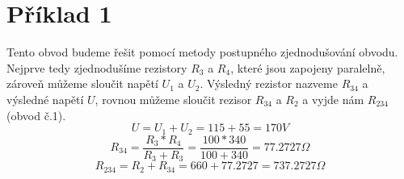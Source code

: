 \section{Příklad 1}
\maketitle
\noindent\makebox[\linewidth]{\rule{\textwidth}{0.3pt}}
Tento obvod budeme řešit pomocí metody postupného zjednodušování obvodu. Nejprve tedy zjednodušíme rezistory $R_3$ a $R_4$, které jsou zapojeny paralelně, zároveň můžeme sloučit napětí $U_1$ a $U_2$. Výsledný rezistor nazveme $R_{34}$ a výsledné napětí $U$, rovnou můžeme sloučit rezisor $R_{34}$ a $R_2$ a vyjde nám $R_{234}$ (obvod č.1).\\
$$U=U_1+U_2=115+55=170 V$$
$$R_{34}=\frac{R_3*R_4}{R_3+R_3}=\frac{100*340}{100+340}=77.2727\Omega$$
$$R_{234}=R_{2}+R_{34}=660+77.2727=737.2727\Omega$$\\

